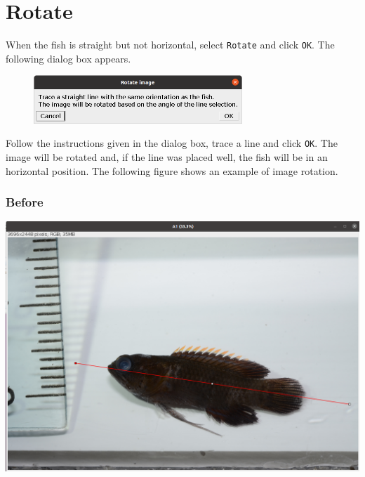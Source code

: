 \documentclass[
  letterpaper,
]{scrbook}
\begin{document}
\hypertarget{rotate}{%
\section*{Rotate}\label{rotate}}

When the fish is straight but not horizontal, select \texttt{Rotate} and
click \texttt{OK}. The following dialog box appears.

\begin{figure}

{\centering \includegraphics[width=0.7\textwidth,height=\textheight]{./images/screenshots/rotate_dialog.png}

}

\end{figure}

Follow the instructions given in the dialog box, trace a line and click
\texttt{OK}. The image will be rotated and, if the line was placed well,
the fish will be in an horizontal position. The following figure shows
an example of image rotation.

\hypertarget{before-1}{%
\subsubsection{\texorpdfstring{\textbf{Before}}{Before}}\label{before-1}}

\includegraphics{./images/screenshots/rotate_example.png}
\end{document}
